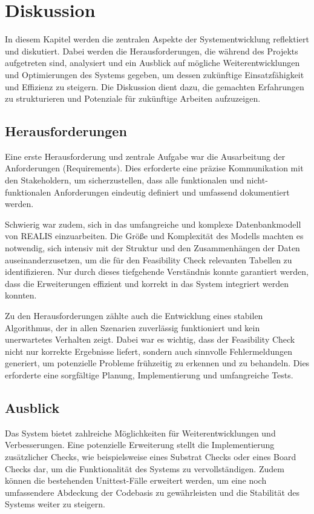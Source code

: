 \chapter{Diskussion}
In diesem Kapitel werden die zentralen Aspekte der Systementwicklung reflektiert und diskutiert. Dabei werden die Herausforderungen, die während des Projekts aufgetreten sind, analysiert und ein Ausblick auf mögliche Weiterentwicklungen und Optimierungen des Systems gegeben, um dessen zukünftige Einsatzfähigkeit und Effizienz zu steigern. Die Diskussion dient dazu, die gemachten Erfahrungen zu strukturieren und Potenziale für zukünftige Arbeiten aufzuzeigen.
\section{Herausforderungen}

Eine erste Herausforderung und zentrale Aufgabe war die Ausarbeitung der Anforderungen (Requirements). Dies erforderte eine präzise Kommunikation mit den Stakeholdern, um sicherzustellen, dass alle funktionalen und nicht-funktionalen Anforderungen eindeutig definiert und umfassend dokumentiert werden. 

Schwierig war zudem, sich in das umfangreiche und komplexe Datenbankmodell von \gls{REALIS} einzuarbeiten. Die Größe und Komplexität des Modells machten es notwendig, sich intensiv mit der Struktur und den Zusammenhängen der Daten auseinanderzusetzen, um die für den Feasibility Check relevanten Tabellen zu identifizieren. Nur durch dieses tiefgehende Verständnis konnte garantiert werden, dass die Erweiterungen effizient und korrekt in das System integriert werden konnten.

Zu den Herausforderungen zählte auch die Entwicklung eines stabilen Algorithmus, der in allen Szenarien zuverlässig funktioniert und kein unerwartetes Verhalten zeigt. Dabei war es wichtig, dass der Feasibility Check nicht nur korrekte Ergebnisse liefert, sondern auch sinnvolle Fehlermeldungen generiert, um potenzielle Probleme frühzeitig zu erkennen und zu behandeln. Dies erforderte eine sorgfältige Planung, Implementierung und umfangreiche Tests.

\section{Ausblick}

Das System bietet zahlreiche Möglichkeiten für Weiterentwicklungen und Verbesserungen. Eine potenzielle Erweiterung stellt die Implementierung zusätzlicher Checks, wie beispielsweise eines Substrat Checks oder eines Board Checks dar, um die Funktionalität des Systems zu vervollständigen. Zudem können die bestehenden Unittest-Fälle erweitert werden, um eine noch umfassendere Abdeckung der Codebasis zu gewährleisten und die Stabilität des Systems weiter zu steigern.

